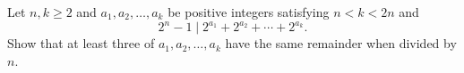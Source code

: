 Let $n,k \geq 2$ and $a_1,a_2,\ldots,a_k$ be positive integers
satisfying $n < k < 2n$ and    
\[
    2^n - 1\mid 2^{a_1} + 2^{a_2} + \cdots + 2^{a_k}.
\]
Show that at least three of $a_1,a_2,\ldots,a_k$ have the same remainder when divided by $n$.
